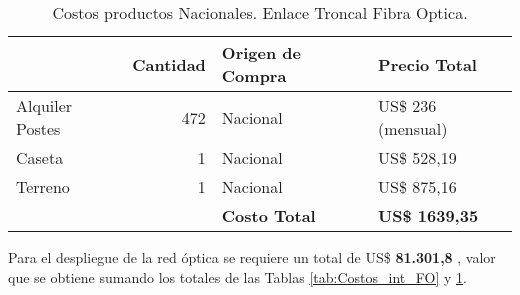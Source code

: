 \begin{table}[htbp]
  \centering
    \begin{tabular}{|r|r|l|l|}
    \hline
    \rowcolor[HTML]{C5D9F1} \multicolumn{1}{|l|}{\textbf{Descripción}} & \multicolumn{1}{l|}{\textbf{Cantidad}} & \textbf{Origen de Compra} & \textbf{Precio Total} \bigstrut\\
    \hline
    \multicolumn{1}{|l|}{Alquiler Postes} & 472   & Nacional & US\$ 236 (mensual) \bigstrut\\
    \hline
    \multicolumn{1}{|l|}{Caseta} & 1     & Nacional & US\$ 528,19 \bigstrut\\
    \hline
    \multicolumn{1}{|l|}{Terreno} & 1     & Nacional & US\$ 875,16 \bigstrut\\
    \hline
    \rowcolor[HTML]{C5D9F1}       &       & \textbf{Costo Total} & \textbf{US\$ 1639,35} \bigstrut\\
    \hline
    \end{tabular}%
\caption{Costos productos Nacionales. Enlace Troncal Fibra Optica.}
  \label{tab:Costos_nac_FO}%
\end{table}%



Para el despliegue de la red óptica se requiere un total de  US\$ \textbf{81.301,8} , valor que se obtiene sumando los totales de las Tablas \ref{tab:Costos_int_FO} y \ref{tab:Costos_nac_FO}.



\newpage






